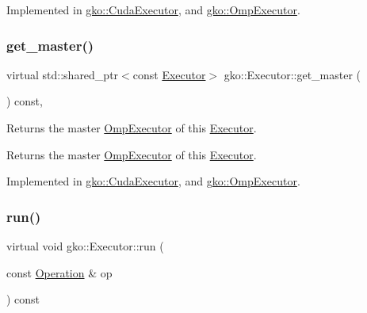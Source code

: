 Implemented in \hyperlink{classgko_1_1CudaExecutor_a59a618e0d48b42fe699e9d4cf347b491}{gko\+::\+Cuda\+Executor}, and \hyperlink{classgko_1_1OmpExecutor_a5b83349e601d473cf8768c0bdbcaca8c}{gko\+::\+Omp\+Executor}.

\mbox{\label{classgko_1_1Executor_a261386e439c8daa6e0d95dc331b9bfeb}} 
\subsubsection{\texorpdfstring{get\+\_\+master()}{get\_master()}\hspace{0.1cm}{\footnotesize\ttfamily [2/2]}}
{\footnotesize\ttfamily virtual std\+::shared\+\_\+ptr$<$const \hyperlink{classgko_1_1Executor}{Executor}$>$ gko\+::\+Executor\+::get\+\_\+master (\begin{DoxyParamCaption}{ }\end{DoxyParamCaption}) const\hspace{0.3cm}{\ttfamily [pure virtual]}, {\ttfamily [noexcept]}}



Returns the master \hyperlink{classgko_1_1OmpExecutor}{Omp\+Executor} of this \hyperlink{classgko_1_1Executor}{Executor}. 

\begin{DoxyReturn}{Returns}
the master \hyperlink{classgko_1_1OmpExecutor}{Omp\+Executor} of this \hyperlink{classgko_1_1Executor}{Executor}. 
\end{DoxyReturn}


Implemented in \hyperlink{classgko_1_1CudaExecutor_a75295b3424224f907958abfa95c66298}{gko\+::\+Cuda\+Executor}, and \hyperlink{classgko_1_1OmpExecutor_ab297a7eba78463784d4d2ca08b03c675}{gko\+::\+Omp\+Executor}.

\mbox{\label{classgko_1_1Executor_a1de8e2668b76e66690acf5eef9e8324d}} 
\subsubsection{\texorpdfstring{run()}{run()}\hspace{0.1cm}{\footnotesize\ttfamily [1/2]}}
{\footnotesize\ttfamily virtual void gko\+::\+Executor\+::run (\begin{DoxyParamCaption}\item[{const \hyperlink{classgko_1_1Operation}{Operation} \&}]{op }\end{DoxyParamCaption}) const\hspace{0.3cm}{\ttfamily [pure virtual]}}



